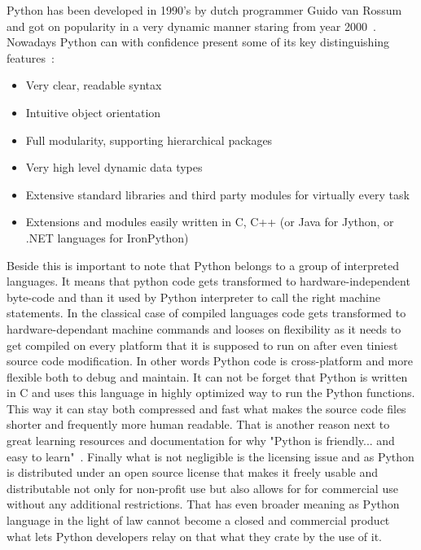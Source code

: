 Python has been developed in 1990's by dutch programmer Guido van Rossum and got on popularity in a very dynamic manner staring from year 2000~\cite{py_code_swarm}. Nowadays Python can with confidence present some of its key distinguishing features~\cite{py_about}:
\begin{itemize}
\item{Very clear, readable syntax}
\item{Intuitive object orientation}
\item{Full modularity, supporting hierarchical packages}
\item{Very high level dynamic data types}
\item{Extensive standard libraries and third party modules for virtually every task}
\item{Extensions and modules easily written in C, C++ (or Java for Jython, or .NET languages for IronPython)}
\end{itemize}
Beside this is important to note that Python belongs to a group of interpreted languages. It means that python code gets transformed to hardware-independent byte-code and than it used by Python interpreter to call the right machine statements. In the classical case of compiled languages code gets transformed to hardware-dependant machine commands and looses on flexibility as it needs to get compiled on every platform that it is supposed to run on after even tiniest source code modification. In other words Python code is cross-platform and more flexible both to debug and maintain. It can not be forget that Python is written in C and uses this language in highly optimized way to run the Python functions. This way it can stay both compressed and fast what makes the source code files shorter and frequently more human readable. That is another reason next to great learning resources and documentation for why "Python is friendly... and easy to learn"~\cite{py_about}. Finally what is not negligible is the licensing issue and as Python is distributed under an open source license that makes it freely usable and distributable not only for non-profit use but also allows for for commercial use without any additional restrictions. That has even broader meaning as Python language in the light of law cannot become a closed and commercial product what lets Python developers relay on that what they crate by the use of it.

